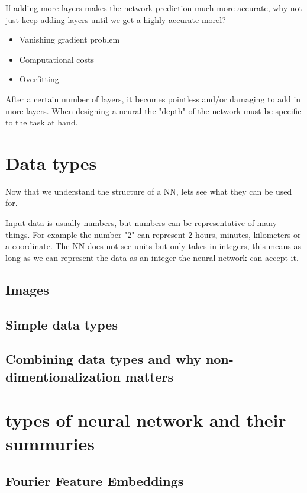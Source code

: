 \documentclass[12pt, a4paper]{article}
\begin{document}
If adding more layers makes the network prediction much more accurate, why not just keep adding layers until we get a highly accurate morel?

\begin{itemize}
    \item Vanishing gradient problem \citep{bengio1994}
    \item Computational costs
    \item Overfitting\citep{srivastava2014}
\end{itemize}

After a certain number of layers, it becomes pointless and/or damaging to add in more layers. When designing a neural the "depth" of the network must be specific to the task at hand.

\section{Data types}

Now that we understand the structure of a NN, lets see what they can be used for. 

Input data is usually numbers, but numbers can be representative of many things. For example the number "2" can represent 2 hours, minutes, kilometers or a coordinate. The NN does not see units but only takes in integers, this means as long as we can represent the data as an integer the neural network can accept it. 

\subsection{Images}
\subsection{Simple data types}
\subsection{Combining data types and why non-dimentionalization matters}
\section{types of neural network and their summuries}


\subsection{Fourier Feature Embeddings}
\label{sec:ffe}
\end{document}
